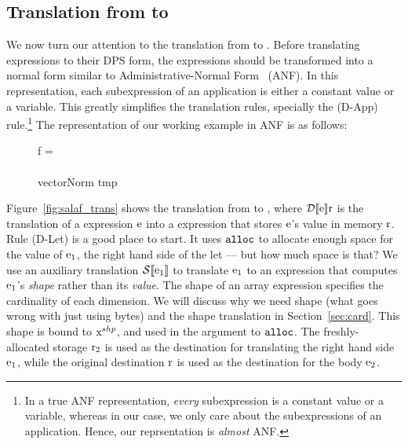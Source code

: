 \subsection{Translation from \lafsharp{} to \salafsharp}
\label{sec:fsmooth_to_dps}



We now turn our attention to the translation from \lafsharp{} to \salafsharp{}.  Before translating \lafsharp{} expressions to their DPS form, the expressions should be transformed into a normal form similar to Administrative-Normal Form~\cite{flanagan1993essence} (ANF). In this representation, 
each subexpression of an application is either a constant value or a variable.
This greatly simplifies the translation rules, specially the (D-App) rule.\footnote{
In a true ANF representation, \textit{every} subexpression is a constant value or a variable,
whereas in our case, we only care about the subexpressions of an application.
Hence, our reprsentation is \textit{almost} ANF.
}
The representation of our working example in ANF is as follows:

\begin{figure}[H]
\hfill\begin{minipage}{.75\textwidth}\raggedright
f = 
\\
\tabt {}
\\
\tabt vectorNorm tmp
\end{minipage}\hfill
\end{figure}

Figure~\ref{fig:salaf_trans} shows the translation from \lafsharp{} to \salafsharp{}, where $\text{$\mathcal{D}\llbracket$\text{e}$\rrbracket$\text{r}}$ is the translation of a \lafsharp{} expression $\text{e}$ into a \salafsharp{} expression that stores $\text{e}$'s value in memory $\text{r}$. Rule (D-Let) is a good place to start.  It uses $\text{\texttt{alloc}}$ to allocate enough space for the value of $\text{$\text{\text{e}}_{1}$}$, the right hand side of the let --- but how much space is that?  We use an auxiliary translation $\text{$\mathcal{S}\llbracket$\text{$\text{\text{e}}_{1}$}$\rrbracket$}$ to translate $\text{$\text{\text{e}}_{1}$}$ to an expression that computes $\text{$\text{\text{e}}_{1}$}$'s \emph{shape} rather than its \emph{value}. The shape of an array expression specifies the cardinality of each dimension. We will discuss why we need shape (what goes wrong with just using bytes) and the shape translation in Section~\ref{sec:card}.  This shape is bound to $\text{$\text{x}^{shp}$}$, and used in the argument to $\text{\texttt{alloc}}$.  The freshly-allocated storage $\text{$\text{r}_{2}$}$ is used as 
the destination for translating the right hand side $\text{$\text{\text{e}}_{1}$}$, while the original destination $\text{r}$ is used as the destination for the body $\text{$\text{\text{e}}_{2}$}$. 


